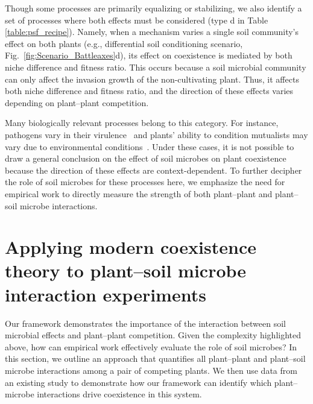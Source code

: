 Though some processes are primarily equalizing or stabilizing, we also identify a set of processes where both effects must be considered (type d in Table \ref{table:psf_recipe}). Namely, when a mechanism varies a single soil community's effect on both plants (e.g., differential soil conditioning scenario, Fig.~\ref{fig:Scenario_Battleaxes}d), its effect on coexistence is mediated by both niche difference and fitness ratio. This occurs because a soil microbial community can only affect the invasion growth of the non-cultivating plant. Thus, it affects both niche difference and fitness ratio, and the direction of these effects varies depending on plant--plant competition.
\par


Many biologically relevant processes belong to this category. For instance, pathogens vary in their virulence~\citep{Reinhart2010} and plants' ability to condition mutualists may vary due to environmental conditions~\citep{Zheng2015, Norby1987}. Under these cases, it is not possible to draw a general conclusion on the effect of soil microbes on plant coexistence because the direction of these effects are context-dependent. To further decipher the role of soil microbes for these processes here, we emphasize the need for empirical work to directly measure the strength of both plant--plant and plant--soil microbe interactions.
\par



\section{Applying modern coexistence theory to plant--soil microbe interaction experiments}
Our framework demonstrates the importance of the interaction between soil microbial effects and plant--plant competition. Given the complexity highlighted above, how can empirical work effectively evaluate the role of soil microbes? %
In this section, we outline an approach that quantifies all plant--plant and plant--soil microbe interactions among a pair of competing plants.
We then use data from an existing study \citep{Aguilera2017} to demonstrate how our framework can identify which plant--microbe interactions drive coexistence in this system.
\par



